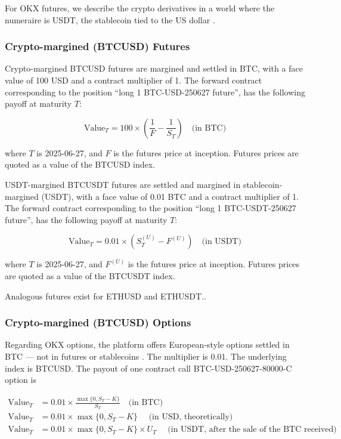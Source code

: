 \documentclass[12pt]{article}
\begin{document}
For OKX futures, we describe the crypto derivatives in a world where the numeraire is USDT, the stablecoin tied to the US dollar \citep{okx_futures}.

\subsubsection{Crypto-margined (BTCUSD) Futures}

Crypto-margined BTCUSD futures are margined and settled in BTC, with a face value of 100 USD and a contract multiplier of 1. The forward contract corresponding to the position ``long 1 BTC-USD-250627 future'', has the following payoff at maturity $T$:

    \begin{equation}
    \text{Value}_T = 100\times(\frac{1}{F} - \frac{1}{S_T})   \quad\text{(in BTC)}
    \end{equation}

where $T$ is 2025-06-27, and $F$ is the futures price at inception. Futures prices are quoted as a value of the BTCUSD index.

USDT-margined BTCUSDT futures are settled and margined in stablecoin-margined (USDT), with a face value of 0.01 BTC and a contract multiplier of 1. The forward contract corresponding to the position ``long 1 BTC-USDT-250627 future'', has the following payoff at maturity $T$:

    \begin{equation}
    \text{Value}_T = 0.01\times(S^{(U)}_T - F^{(U)})   \quad\text{(in USDT)}
    \end{equation}

where $T$ is 2025-06-27, and $F^{(U)}$ is the futures price at inception. Futures prices are quoted as a value of the BTCUSDT index.

Analogous futures exist for ETHUSD and ETHUSDT.\cite{okx_futures}.

\subsubsection{Crypto-margined (BTCUSD) Options}

Regarding OKX options, the platform offers European-style options settled in BTC — not in futures or stablecoins \citep{okx_options}. The multiplier is 0.01. The underlying index is BTCUSD. The payout of one contract call BTC-USD-250627-80000-C option is

    \begin{align}
    \text{Value}_T &=  0.01\times\frac{\max\{0, S_T - K\}}{S_T} \quad\text{(in BTC)}\\
    \text{Value}_T &=  0.01\times\max\{0, S_T - K\} \quad\text{  (in USD, theoretically)}\\
    \text{Value}_T &=  0.01\times\max\{0, S_T - K\} \times U_T \quad\text{  (in USDT, after the sale of the BTC received)}
    \end{align}
\end{document}
